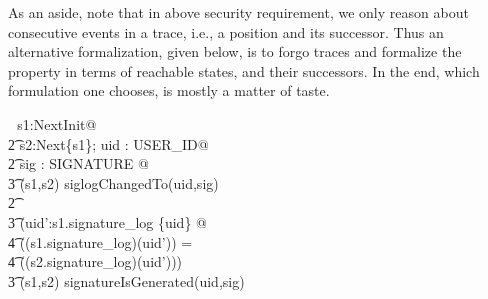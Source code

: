 \documentclass[a4paper,pdftex]{article}
\newcommand{\turnstile}{\vdash \, \,}
\newcommand{\zcomment}[1]{#1}
\begin{document}

As an aside, note that in above security requirement, we only
reason about consecutive events in a trace, i.e., a position and
its successor.  Thus an alternative formalization, given below,
is to forgo traces and formalize the property 
in terms of reachable states, and their successors. 
In the end,  which formulation one chooses, is mostly a matter of taste.
\zcomment{
\begin{zed}
\turnstile \forall s1:Next\star\limg Init\rimg @                        \\
\t2           \forall s2:Next\limg \{s1\}\rimg; uid : USER\_ID@         \\
\t2           \exists sig : SIGNATURE @                                 \\
\t3                           (s1,s2) \in siglogChangedTo(uid,sig)      \\
\t2                        \implies                                     \\
\t3                          (\forall uid':\dom s1.signature\_log \setminus \{uid\} @ \\
\t4                            ((s1.signature\_log)(uid')) =            \\
\t4                            ((s2.signature\_log)(uid'))) \land       \\
\t3                            (s1,s2) \in signatureIsGenerated(uid,sig) 
\end{zed}
}
\end{document}
